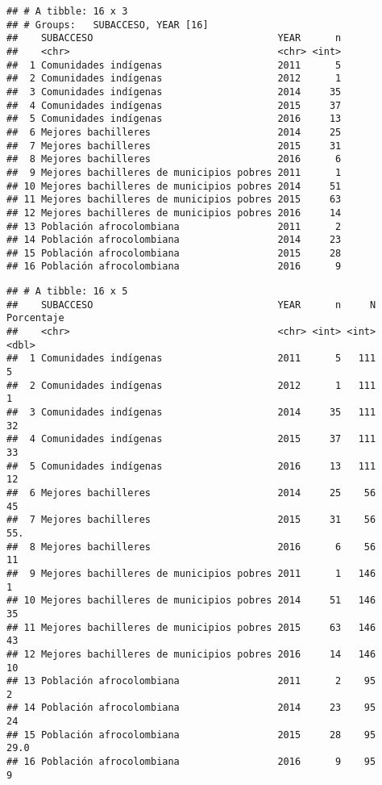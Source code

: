 \documentclass[]{article}
\theoremstyle{definition}
\theoremstyle{definition}
\theoremstyle{definition}
\theoremstyle{remark}
\begin{document}
\begin{verbatim}
## # A tibble: 16 x 3
## # Groups:   SUBACCESO, YEAR [16]
##    SUBACCESO                                YEAR      n
##    <chr>                                    <chr> <int>
##  1 Comunidades indígenas                    2011      5
##  2 Comunidades indígenas                    2012      1
##  3 Comunidades indígenas                    2014     35
##  4 Comunidades indígenas                    2015     37
##  5 Comunidades indígenas                    2016     13
##  6 Mejores bachilleres                      2014     25
##  7 Mejores bachilleres                      2015     31
##  8 Mejores bachilleres                      2016      6
##  9 Mejores bachilleres de municipios pobres 2011      1
## 10 Mejores bachilleres de municipios pobres 2014     51
## 11 Mejores bachilleres de municipios pobres 2015     63
## 12 Mejores bachilleres de municipios pobres 2016     14
## 13 Población afrocolombiana                 2011      2
## 14 Población afrocolombiana                 2014     23
## 15 Población afrocolombiana                 2015     28
## 16 Población afrocolombiana                 2016      9
\end{verbatim}

\begin{verbatim}
## # A tibble: 16 x 5
##    SUBACCESO                                YEAR      n     N Porcentaje
##    <chr>                                    <chr> <int> <int>      <dbl>
##  1 Comunidades indígenas                    2011      5   111        5  
##  2 Comunidades indígenas                    2012      1   111        1  
##  3 Comunidades indígenas                    2014     35   111       32  
##  4 Comunidades indígenas                    2015     37   111       33  
##  5 Comunidades indígenas                    2016     13   111       12  
##  6 Mejores bachilleres                      2014     25    56       45  
##  7 Mejores bachilleres                      2015     31    56       55. 
##  8 Mejores bachilleres                      2016      6    56       11  
##  9 Mejores bachilleres de municipios pobres 2011      1   146        1  
## 10 Mejores bachilleres de municipios pobres 2014     51   146       35  
## 11 Mejores bachilleres de municipios pobres 2015     63   146       43  
## 12 Mejores bachilleres de municipios pobres 2016     14   146       10  
## 13 Población afrocolombiana                 2011      2    95        2  
## 14 Población afrocolombiana                 2014     23    95       24  
## 15 Población afrocolombiana                 2015     28    95       29.0
## 16 Población afrocolombiana                 2016      9    95        9
\end{verbatim}
\end{document}
